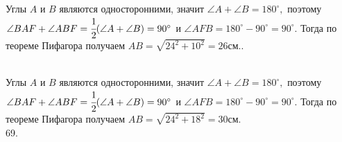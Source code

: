\documentclass[12pt]{article}
\begin{document}
Углы $A$ и $B$ являются односторонними, значит $\angle A+\angle B=180^\circ,$ поэтому $\angle BAF+\angle ABF=\cfrac{1}{2}(\angle A+\angle B)=90^\circ$ и $\angle AFB=180^\circ-90^\circ=90^\circ.$ Тогда по теореме Пифагора получаем $AB=\sqrt{24^2+10^2}=26$см.\newpage{}. \begin{figure}[ht!]
\end{figure}\\
Углы $A$ и $B$ являются односторонними, значит $\angle A+\angle B=180^\circ,$ поэтому $\angle BAF+\angle ABF=\cfrac{1}{2}(\angle A+\angle B)=90^\circ$ и $\angle AFB=180^\circ-90^\circ=90^\circ.$ Тогда по теореме Пифагора получаем $AB=\sqrt{24^2+18^2}=30$см.\\
69. \begin{figure}[ht!]
\end{figure}\\
\end{document}
